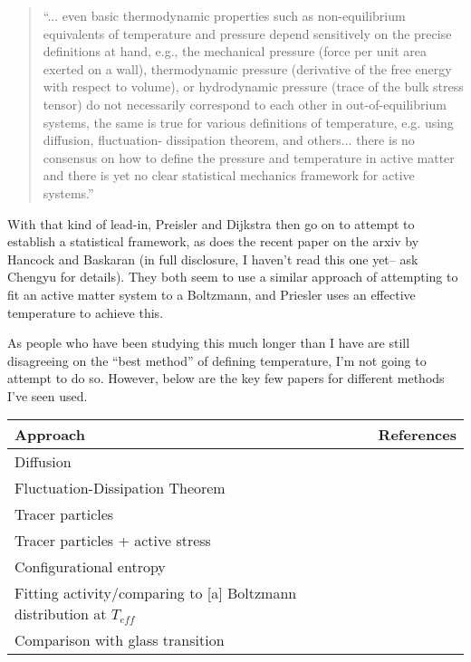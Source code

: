 \documentclass[11pt]{article}   	%
\begin{document}
\begin{quote}
``... even basic thermodynamic properties such as non-equilibrium equivalents of temperature and pressure depend sensitively on the precise definitions at hand, e.g., the mechanical pressure (force per unit area exerted on a wall), thermodynamic pressure (derivative of the free energy with respect to volume), or hydrodynamic pressure (trace of the bulk stress tensor) do not necessarily correspond to each other in out-of-equilibrium systems, the same is true for various definitions of temperature, e.g. using diffusion, fluctuation- dissipation theorem, and others... there is no consensus on how to define the pressure and temperature in active matter and there is yet no clear statistical mechanics framework for active systems.'' \cite{PreislerDijkstra_2016_SoftMatter}
\end{quote}

With that kind of lead-in, Preisler and Dijkstra then go on to attempt to establish a statistical framework, as does the recent paper on the arxiv by Hancock and Baskaran \cite{HancockBaskaran_2017_arxiv} (in full disclosure, I haven't read this one yet-- ask Chengyu for details). They both seem to use a similar approach of attempting to fit an active matter system to a Boltzmann, and Priesler uses an effective temperature to achieve this.

As people who have been studying this much longer than I have are still disagreeing on the ``best method'' of defining temperature, I'm not going to attempt to do so. However, below are the key few papers for different methods I've seen used. 

\begin{tabular}{| p{4.5in} | p{1in} |}
\hline
\textbf{Approach} & \textbf{References} \\
\hline
Diffusion & \cite{Cates_2012_RepProgPhys} \\
Fluctuation-Dissipation Theorem & \cite{LoiEA_2008_PRE, LoiEA_2011_SoftMatter, WangWolynes_2011_JChemPhys} \\
Tracer particles & \cite{LoiEA_2011_SoftMatter} \\
Tracer particles + active stress & \cite{MarchettiEA_2013_RevModPhys} \\
Configurational entropy & \cite{PreislerDijkstra_2016_SoftMatter} \\
Fitting activity/comparing to [a] Boltzmann distribution at $T_{eff}$ & \cite{PreislerDijkstra_2016_SoftMatter, PaoluzziLeonardoAngelani_2014_JPhysConMat, MaggiEA_2014_PRL} \\
Comparison with glass transition & \cite{BerthierKurchan_2013_NaturePhysics} \\
\hline
\end{tabular}
\end{document}
